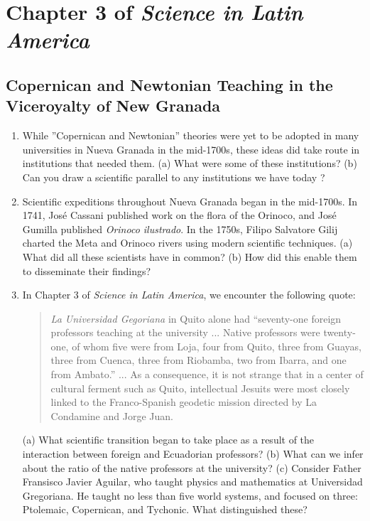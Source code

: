 \documentclass[12pt]{article}
\begin{document}
\maketitle

\small

\section{Chapter 3 of \textit{Science in Latin America}}

\subsection{Copernican and Newtonian Teaching in the Viceroyalty of New Granada}

\begin{enumerate}
\item While ''Copernican and Newtonian'' theories were yet to be adopted in many universities in Nueva Granada in the mid-1700s, these ideas did take route in institutions that needed them.  (a) What were some of these institutions? (b) Can you draw a scientific parallel to any institutions we have today ? \\ \vspace{0.5cm}
\item Scientific expeditions throughout Nueva Granada began in the mid-1700s.  In 1741, Jos\'{e} Cassani published work on the flora of the Orinoco, and Jos\'{e} Gumilla published \textit{Orinoco ilustrado}.  In the 1750s, Filipo Salvatore Gilij charted the Meta and Orinoco rivers using modern scientific techniques. (a) What did all these scientists have in common? (b) How did this enable them to disseminate their findings? \\ \vspace{0.5cm}
\item In Chapter 3 of \textit{Science in Latin America}, we encounter the following quote:
\begin{quotation}
\textit{La Universidad Gegoriana} in Quito alone had ``seventy-one foreign professors teaching at the university ... Native professors were twenty-one, of whom five were from Loja, four from Quito, three from Guayas, three from Cuenca, three from Riobamba, two from Ibarra, and one from Ambato.'' ... As a consequence, it is not strange that in a center of cultural ferment such as Quito, intellectual Jesuits were most closely linked to the Franco-Spanish geodetic mission directed by La Condamine and Jorge Juan.
\end{quotation}
(a) What scientific transition began to take place as a result of the interaction between foreign and Ecuadorian professors? (b) What can we infer about the ratio of the native professors at the university? (c) Consider Father Fransisco Javier Aguilar, who taught physics and mathematics at Universidad Gregoriana.  He taught no less than five world systems, and focused on three: Ptolemaic, Copernican, and Tychonic.  What distinguished these? \\ \vspace{0.5cm}
\end{enumerate}
\end{document}
